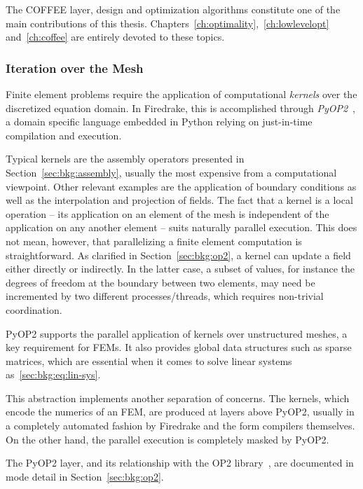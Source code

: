 The COFFEE layer, design and optimization algorithms constitute one of the main contributions of this thesis. Chapters~\ref{ch:optimality},~\ref{ch:lowlevelopt} and~\ref{ch:coffee} are entirely devoted to these topics.

\subsubsection{Iteration over the Mesh}
\label{sec:bkg:meshiteration}
Finite element problems require the application of computational {\em kernels} over the discretized equation domain. In Firedrake, this is accomplished through {\em PyOP2}~\cite{pyop2isc}, a domain specific language embedded in Python relying on just-in-time compilation and execution. 

Typical kernels are the assembly operators presented in Section~\ref{sec:bkg:assembly}, usually the most expensive from a computational viewpoint. Other relevant examples are the application of boundary conditions as well as the interpolation and projection of fields. The fact that a kernel is a local operation -- its application on an element of the mesh is independent of the application on any another element -- suits naturally parallel execution. This does not mean, however, that parallelizing a finite element computation is straightforward. As clarified in Section~\ref{sec:bkg:op2}, a kernel can update a field either directly or indirectly. In the latter case, a subset of values, for instance the degrees of freedom at the boundary between two elements, may need be incremented by two different processes/threads, which requires non-trivial coordination.

PyOP2 supports the parallel application of kernels over unstructured meshes, a key requirement for FEMs. It also provides global data structures such as sparse matrices, which are essential when it comes to solve linear systems as~\ref{sec:bkg:eq:lin-sys}.

This abstraction implements another separation of concerns. The kernels, which encode the numerics of an FEM, are produced at layers above PyOP2, usually in a completely automated fashion by Firedrake and the form compilers themselves. On the other hand, the parallel execution is completely masked by PyOP2. 

The PyOP2 layer, and its relationship with the OP2 library~\cite{op2-main}, are documented in mode detail in Section~\ref{sec:bkg:op2}.


